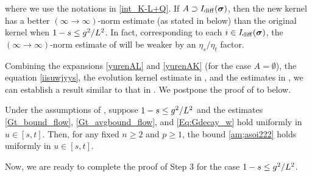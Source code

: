 where we use the notations in \eqref{int_K-L+Q}. %
If $A\supset I_{\mathrm{diff}}({\boldsymbol{\sigma}})$, then the new kernel  has a better $(\infty\to \infty)$-norm estimate (as stated in  below) than the original kernel  when $1-s\le g^2/L^{2}$. In fact, corresponding to each $i\in I_{\mathrm{diff}}({\boldsymbol{\sigma}})$, the $(\infty\to \infty)$-norm estimate of  will be weaker by an $\eta_s/\eta_t$ factor.  

Combining the expansions \eqref{yurenAL} and \eqref{yurenAK} (for the case $A=\emptyset$), the equation \eqref{iisuwjyys}, the evolution kernel estimate in , and the estimates in , we can establish a result similar to that in . We postpone the proof of  to  below.

\begin{lemma}\label{lem:STOeq_Qt_nonzero} 
Under the assumptions of , suppose $1-s\le g^2/L^{2}$ and the estimates \eqref{Gt_bound_flow}, \eqref{Gt_avgbound_flow}, and \eqref{Eq:Gdecay_w} hold uniformly in $u\in[s,t]$. 
Then, for any fixed $n\ge 2$ and $p\ge 1$, the bound \eqref{am;asoi222} holds uniformly in $u\in[s,t]$. 
\end{lemma}

Now, we are ready to complete the proof of Step 3 for the case $1-s\le g^2/L^{2}$.


